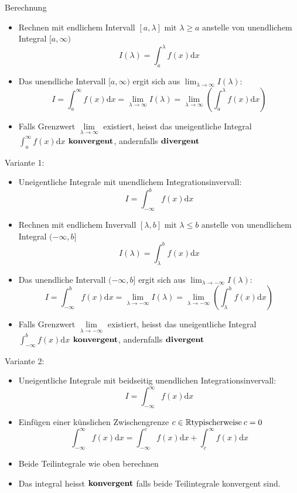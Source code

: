 \begin{KR}{Berechnung}\\
\begin{itemize}
	\item Rechnen mit endlichem Intervall \([a,\lambda] \text{ mit } \lambda \ge a \) anstelle von unendlichem
		Integral \([a,\infty) \)
		\[I(\lambda)=\int_a^{\lambda}{f(x)\mathrm{d}x} \]
	\item Das unendliche Intervall \([a,\infty) \) ergit sich aus \(\lim_{\lambda \rightarrow
		\infty}I(\lambda) \):
		\[I=\int_a^{\infty}{f(x)\mathrm{d}x}=\underset{\lambda \rightarrow \infty}{\lim}I(\lambda)=
		\underset{\lambda \rightarrow \infty}{\lim}\left(\int_a^{\lambda}{f(x)\mathrm{d}x}\right) \]
	\item Falls Grenzwert \(\underset{\lambda \rightarrow \infty}{\lim}\) existiert, heisst das uneigentliche
		Integral \(\displaystyle\int_a^{\infty}{f(x)\mathrm{d}x}\) \(\bold{konvergent}\), andernfalls 
		\(\bold{divergent}\)
\end{itemize}
		\tcbline	
		Variante 1:
\begin{itemize}
	\item Uneigentliche Integrale mit unendlichem Integrationsinvervall:
	\[I=\int_{-\infty}^b{f(x)\mathrm{d}x} \]
	\item Rechnen mit endlichem Invervall \([\lambda,b] \text{ mit } \lambda \le b \) anstelle von unendlichem
		Integral \((-\infty,b] \)
		\[I(\lambda)=\int_{\lambda}^b{f(x)\mathrm{d}x} \]
	\item Das unendliche Intervall \((-\infty,b] \) ergit sich aus \(\lim_{\lambda \rightarrow
		-\infty}I(\lambda) \):
		\[I=\int_{-\infty}^b{f(x)\mathrm{d}x}=\underset{\lambda \rightarrow -\infty}{\lim}I(\lambda)=
		\underset{\lambda \rightarrow -\infty}{\lim}\left(\int_{\lambda}^b{f(x)\mathrm{d}x}\right) \]
	\item Falls Grenzwert \(\underset{\lambda \rightarrow -\infty}{\lim}\) existiert, heisst das uneigentliche
		Integral \(\displaystyle\int_{-\infty}^b{f(x)\mathrm{d}x}\) \(\bold{konvergent}\), andernfalls 
		\(\bold{divergent}\)
\end{itemize}
	\tcbline
	Variante 2:
\begin{itemize}
	\item Uneigentliche Integrale mit beidseitig unendlichen Integrationsinvervall:
		\[I=\int_{-\infty}^{\infty}{f(x)\mathrm{d}x}\]
	\item Einfügen einer künslichen Zwischengrenze \(c \in \mathbb{R}\\\text{typischerweise}\:c=0 \)
		\[\int_{-\infty}^{\infty}{f(x)\mathrm{d}x}=\int_{-\infty}^{c}{f(x)\mathrm{d}x}+\int_c^{\infty}
		{f(x)\mathrm{d}x} \]
	\item Beide Teilintegrale wie oben berechnen
	\item Das integral heisst \(\bold{konvergent}\) falls beide Teilintegrale konvergent sind.
\end{itemize}
\end{KR}
